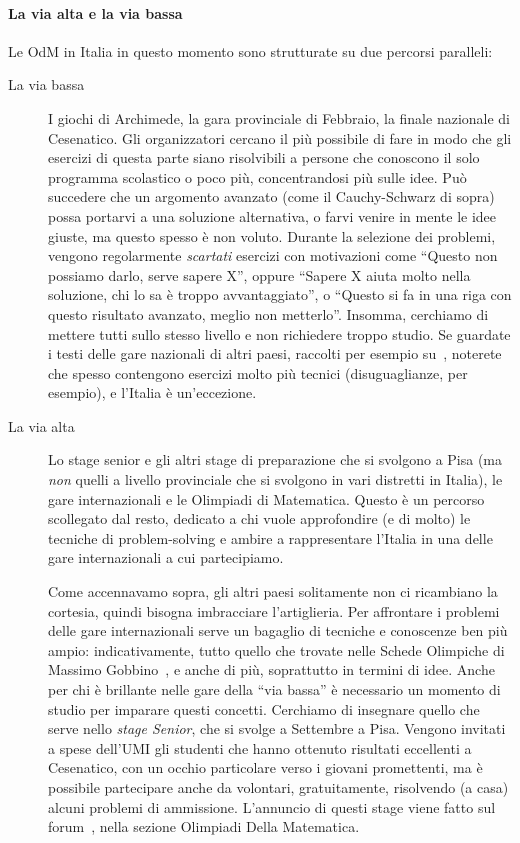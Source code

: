 \documentclass[a4paper,10pt]{paper}
\begin{document}
\paragraph{La via alta e la via bassa}
Le OdM in Italia in questo momento sono strutturate su due percorsi paralleli:
\begin{description}
\item[La via bassa] I giochi di Archimede, la gara provinciale di Febbraio, la finale nazionale di Cesenatico. Gli organizzatori cercano il più possibile di fare in modo che gli esercizi di questa parte siano risolvibili a persone che conoscono il solo programma scolastico o poco più, concentrandosi più sulle idee. Può succedere che un argomento avanzato (come il Cauchy-Schwarz di sopra) possa portarvi a una soluzione alternativa, o farvi venire in mente le idee giuste, ma questo spesso è non voluto. Durante la selezione dei problemi, vengono regolarmente \emph{scartati} esercizi con motivazioni come ``Questo non possiamo darlo, serve sapere X'', oppure ``Sapere X aiuta molto nella soluzione, chi lo sa è troppo avvantaggiato'', o ``Questo si fa in una riga con questo risultato avanzato, meglio non metterlo''. Insomma, cerchiamo di mettere tutti sullo stesso livello e non richiedere troppo studio. Se guardate i testi delle gare nazionali di altri paesi, raccolti per esempio su~\cite{mathlinks}, noterete che spesso contengono esercizi molto più tecnici (disuguaglianze, per esempio), e l'Italia è un'eccezione.
 
\item[La via alta] Lo stage senior e gli altri stage di preparazione che si svolgono a Pisa (ma \emph{non} quelli a livello provinciale che si svolgono in vari distretti in Italia), le gare internazionali e le Olimpiadi di Matematica. Questo è un percorso scollegato dal resto, dedicato a chi vuole approfondire (e di molto) le tecniche di problem-solving e ambire a rappresentare l'Italia in una delle gare internazionali a cui partecipiamo.

Come accennavamo sopra, gli altri paesi solitamente non ci ricambiano la cortesia, quindi bisogna imbracciare l'artiglieria. Per affrontare i problemi delle gare internazionali serve un bagaglio di tecniche e conoscenze ben più ampio: indicativamente, tutto quello che trovate nelle Schede Olimpiche di Massimo Gobbino~\cite{schedeolimpiche}, e anche di più, soprattutto in termini di idee. Anche per chi è brillante nelle gare della ``via bassa'' è necessario un momento di studio per imparare questi concetti. Cerchiamo di insegnare quello che serve nello \emph{stage Senior}, che si svolge a Settembre a Pisa. Vengono invitati a spese dell'UMI gli studenti che hanno ottenuto risultati eccellenti a Cesenatico, con un occhio particolare verso i giovani promettenti, ma è possibile partecipare anche da volontari, gratuitamente, risolvendo (a casa) alcuni problemi di ammissione. L'annuncio di questi stage viene fatto sul forum~\cite{oliforum}, nella sezione Olimpiadi Della Matematica.
\end{description}
\end{document}
